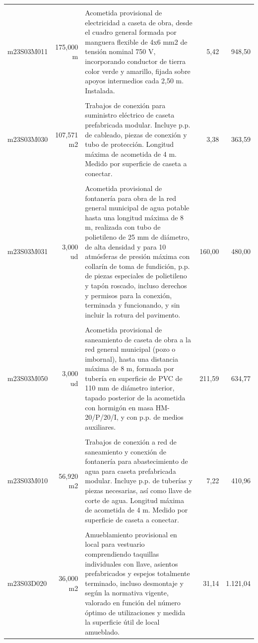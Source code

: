 \documentclass{book}%
\begin{document}
\begin{longtable}{lrlrr}
&&&&\\%
m23S03M011&   175,000 m&\multicolumn{1}{p{5cm}}{Acometida provisional de electricidad a caseta de obra, desde el cuadro general formada por manguera flexible de 4x6 mm2 de tensión nominal 750 V, incorporando conductor de tierra color verde y amarillo, fijada sobre apoyos intermedios cada 2,50 m. Instalada.}&      5,42&948,50\\%
&&&&\\%
m23S03M030&   107,571 m2&\multicolumn{1}{p{5cm}}{Trabajos de conexión para suministro eléctrico de caseta prefabricada modular. Incluye p.p. de cableado, piezas de conexión y tubo de protección. Longitud máxima de acometida de 4 m. Medido por superficie de caseta a conectar.}&      3,38&363,59\\%
&&&&\\%
m23S03M031&     3,000 ud&\multicolumn{1}{p{5cm}}{Acometida provisional de fontanería para obra de la red general municipal de agua potable hasta una longitud máxima de 8 m, realizada con tubo de polietileno de 25 mm de diámetro, de alta densidad y para 10 atmósferas de presión máxima con collarín de toma de fundición, p.p. de piezas especiales de polietileno y tapón roscado, incluso derechos y permisos para la conexión, terminada y funcionando, y sin incluir la rotura del pavimento.}&    160,00&480,00\\%
&&&&\\%
m23S03M050&     3,000 ud&\multicolumn{1}{p{5cm}}{Acometida provisional de saneamiento de caseta de obra a la red general municipal (pozo o imbornal), hasta una distancia máxima de 8 m, formada por tubería en superficie de PVC de 110 mm de diámetro interior, tapado posterior de la acometida con hormigón en masa HM{-}20/P/20/I, y con p.p. de medios auxiliares.}&    211,59&634,77\\%
&&&&\\%
m23S03M010&    56,920 m2&\multicolumn{1}{p{5cm}}{Trabajos de conexión a red de saneamiento y conexión de fontanería para abastecimiento de agua para caseta prefabricada modular. Incluye p.p. de tuberías y piezas necesarias, así como llave de corte de agua. Longitud máxima de acometida de 4 m. Medido por superficie de caseta a conectar.}&      7,22&410,96\\%
&&&&\\%
m23S03D020&    36,000 m2&\multicolumn{1}{p{5cm}}{Amueblamiento provisional en local para vestuario comprendiendo taquillas individuales con llave, asientos prefabricados y espejos totalmente terminado, incluso desmontaje y según la normativa vigente, valorado en función del número óptimo de utilizaciones y medida la superficie útil de local amueblado.}&     31,14&1.121,04\\%

\end{longtable}
\end{document}
